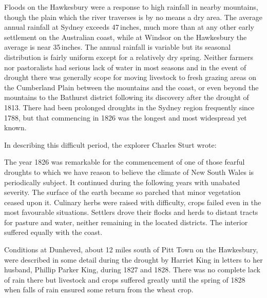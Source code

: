 Floods on the Hawkesbury were a response to high rainfall in nearby
mountains, though the plain which the river traverses is by no means a
dry area.  The average annual rainfall at Sydney exceeds 47\,inches,
much more than at any other early settlement on the Australian coast,
while at Windsor  on the Hawkesbury the average is
near 35\,inches. The annual rainfall is variable but its seasonal
distribution is fairly uniform except for a relatively dry spring.
Neither farmers nor pastoralists had serious lack of water in most
seasons and in the event of drought there was generally scope for
moving livestock to fresh grazing areas on the Cumberland Plain
between the mountains and the coast, or even beyond the mountains to
the Bathurst district following its discovery after the drought of
1813.  There had been prolonged droughts in the Sydney region
frequently since 1788, but that commencing in 1826 was the longest and
most widespread yet known.

In describing this difficult period, the explorer Charles Sturt
 wrote:
\begin{Quote}
	The year 1826 was remarkable for the commencement of one of
	those fearful droughts to which we have reason to believe the
	climate of New South Wales is periodically subject.  It
	continued during the following years with unabated severity.
	The surface of the earth became so parched that minor
	vegetation ceased upon it.  Culinary herbs were raised with
	difficulty, crops failed even in the most favourable
	situations.  Settlers drove their flocks and herds to distant
	tracts for pasture and water, neither remaining in the located
	districts.  The interior suffered equally with the
	coast.\fn{\cite{sturt1833}.}
\end{Quote}

Conditions at Dunheved, about 12 miles south of
Pitt Town on the Hawkesbury, were described in
some detail during the drought by Harriet King \index{King, H.} in
letters to her husband, Phillip Parker King, \index{King, P.\,K.}
during 1827 and 1828. There was no complete lack of rain there but
livestock and crops suffered greatly until the spring of 1828 when
falls of rain ensured some return from the wheat
crop.\fn{\cite{walsh1967}.}

